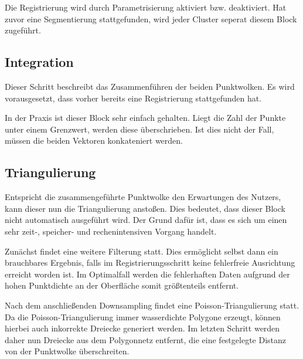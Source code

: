 Die Registrierung wird durch Parametrisierung aktiviert bzw. deaktiviert.
Hat zuvor eine Segmentierung stattgefunden, wird jeder Cluster seperat diesem Block zugeführt.


\subsection{Integration}
\label{subsec:pipeline-integration}

Dieser Schritt beschreibt das Zusammenführen der beiden Punktwolken.
Es wird vorausgesetzt, dass vorher bereits eine Registrierung stattgefunden hat.

In der Praxis ist dieser Block sehr einfach gehalten.
Liegt die Zahl der Punkte unter einem Grenzwert, werden diese überschrieben.
Ist dies nicht der Fall, müssen die beiden Vektoren konkateniert werden.


\subsection{Triangulierung}
\label{subsec:pipeline-triangulierung}

Entspricht die zusammengeführte Punktwolke den Erwartungen des Nutzers, kann dieser nun die Triangulierung anstoßen.
Dies bedeutet, dass dieser Block nicht automatisch ausgeführt wird.
Der Grund dafür ist, dass es sich um einen sehr zeit-, speicher- und rechenintensiven Vorgang handelt.

Zunächst findet eine weitere Filterung statt.
Dies ermöglicht selbst dann ein brauchbares Ergebnis, falls im Registrierungsschritt keine fehlerfreie Ausrichtung erreicht worden ist.
Im Optimalfall werden die fehlerhaften Daten aufgrund der hohen Punktdichte an der Oberfläche somit größtenteils entfernt.

Nach dem anschließenden Downsampling findet eine Poisson-Triangulierung statt.
Da die Poisson-Triangulierung immer wasserdichte Polygone erzeugt, können hierbei auch inkorrekte Dreiecke generiert werden.
Im letzten Schritt werden daher nun Dreiecke aus dem Polygonnetz entfernt, die eine festgelegte Distanz von der Punktwolke überschreiten.
